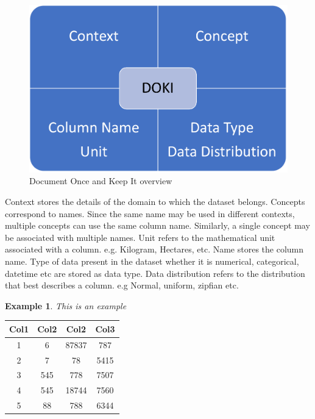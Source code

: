 \documentclass{vldb}
\begin{document}
\begin{figure}[h]
	\centering
	\includegraphics[width=0.8\columnwidth]{graphics/DOKI.pdf}
	\caption{Document Once and Keep It overview}
	\label{fig:DOKI}
	\vspace*{-1mm}
\end{figure}

Context stores the details of the domain to which the dataset belongs. Concepts correspond to names. Since the same name may be used in different contexts, multiple concepts can use the same column name. Similarly, a single concept may be associated with multiple names.
Unit refers to the mathematical unit associated with a column. e.g. Kilogram, Hectares, etc. Name stores the column name. Type of data present in the dataset whether it is numerical, categorical, datetime etc are stored as data type. Data distribution refers to the distribution that best describes a column. e.g Normal, uniform, zipfian etc.

\newtheorem{exmp}{Example}[section]
\begin{exmp}
	This is an example
\end{exmp}

\begin{center}
	\begin{tabular}{||c c c c||} 
		\hline
		Col1 & Col2 & Col2 & Col3 \\ [0.5ex] 
		\hline\hline
		1 & 6 & 87837 & 787 \\ 
		\hline
		2 & 7 & 78 & 5415 \\
		\hline
		3 & 545 & 778 & 7507 \\
		\hline
		4 & 545 & 18744 & 7560 \\
		\hline
		5 & 88 & 788 & 6344 \\ [1ex] 
		\hline
	\end{tabular}
\end{center}
\end{document}
